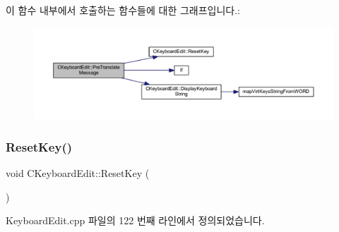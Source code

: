 이 함수 내부에서 호출하는 함수들에 대한 그래프입니다.\+:
\nopagebreak
\begin{figure}[H]
\begin{center}
\leavevmode
\includegraphics[width=350pt]{class_c_keyboard_edit_a7700247028b07400adf5056c6627e19a_cgraph}
\end{center}
\end{figure}
\mbox{\label{class_c_keyboard_edit_ad0185cc0cad77250cc32ef1d9ffb8593}} 
\subsubsection{\texorpdfstring{Reset\+Key()}{ResetKey()}}
{\footnotesize\ttfamily void C\+Keyboard\+Edit\+::\+Reset\+Key (\begin{DoxyParamCaption}{ }\end{DoxyParamCaption})}



Keyboard\+Edit.\+cpp 파일의 122 번째 라인에서 정의되었습니다.



